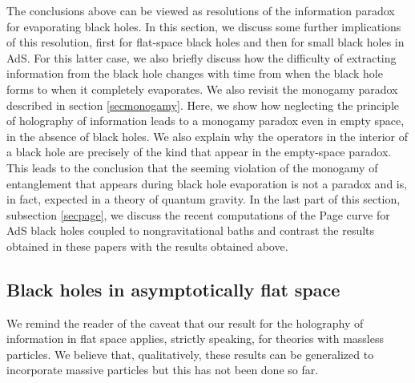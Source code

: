 \documentclass[12pt]{article}
\begin{document}
The conclusions above can be viewed as resolutions of the information paradox for evaporating black holes.
In this section, we discuss some further implications of this resolution, first for flat-space black holes and then for small black holes in AdS. For this latter case, we also briefly discuss how the difficulty of extracting information from the black hole changes with time from when the black hole forms to when it completely evaporates. We also revisit the monogamy paradox described in section \ref{secmonogamy}.
Here, we show how neglecting the principle of holography of information leads to a monogamy paradox even in empty space, in the absence of black holes.  We also explain why the operators in the interior of a black hole are precisely of the kind that appear in the empty-space paradox.  This leads to the conclusion that the seeming violation of the monogamy of entanglement that appears during black hole evaporation is not a paradox and is, in fact, expected in a theory of quantum gravity. In the last part of this section, subsection \ref{secpage}, we discuss the recent computations of the Page curve for AdS black holes coupled to nongravitational baths and contrast the results obtained in these papers with the results obtained above.








\subsection{Black holes in asymptotically flat space}
We remind the reader of the caveat that our result for the holography of information in flat space applies, strictly speaking, for theories with massless particles. We believe that, qualitatively, these results can be generalized to incorporate massive particles but this has not been done so far.
\end{document}
